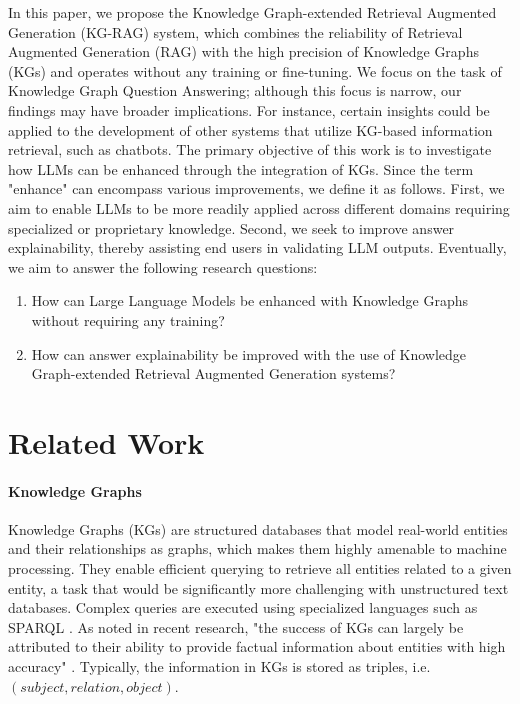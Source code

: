 \documentclass[pdflatex,sn-mathphys-num]{sn-jnl}%
\theoremstyle{thmstyleone}%
\theoremstyle{thmstyletwo}%
\theoremstyle{thmstylethree}%
\begin{document}
In this paper, we propose the Knowledge Graph-extended Retrieval Augmented Generation (KG-RAG) system, which combines the reliability of Retrieval Augmented Generation (RAG) with the high precision of Knowledge Graphs (KGs) and operates without any training or fine-tuning. We focus on the task of Knowledge Graph Question Answering; although this focus is narrow, our findings may have broader implications. For instance, certain insights could be applied to the development of other systems that utilize KG-based information retrieval, such as chatbots. The primary objective of this work is to investigate how LLMs can be enhanced through the integration of KGs. Since the term "enhance" can encompass various improvements, we define it as follows. First, we aim to enable LLMs to be more readily applied across different domains requiring specialized or proprietary knowledge. Second, we seek to improve answer explainability, thereby assisting end users in validating LLM outputs. Eventually, we aim to answer the following research questions:
\begin{enumerate} 
    \item How can Large Language Models be enhanced with Knowledge Graphs without requiring any training?
    \item How can answer explainability be improved with the use of Knowledge Graph-extended Retrieval Augmented Generation systems?    
\end{enumerate}

\section{Related Work}
\label{sec:related_work}

\paragraph{Knowledge Graphs} Knowledge Graphs (KGs) are structured databases that model real-world entities and their relationships as graphs, which makes them highly amenable to machine processing. They enable efficient querying to retrieve all entities related to a given entity, a task that would be significantly more challenging with unstructured text databases. Complex queries are executed using specialized languages such as SPARQL \cite{arenas2013}. As noted in recent research, "the success of KGs can largely be attributed to their ability to provide factual information about entities with high accuracy" \cite{PanKalo2023}. Typically, the information in KGs is stored as triples, i.e. $(subject, relation, object)$.
\end{document}
